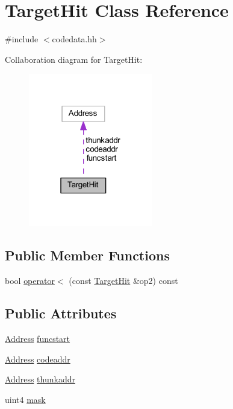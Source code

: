 \hypertarget{class_target_hit}{}\section{Target\+Hit Class Reference}
\label{class_target_hit}


{\ttfamily \#include $<$codedata.\+hh$>$}



Collaboration diagram for Target\+Hit\+:
\nopagebreak
\begin{figure}[H]
\begin{center}
\leavevmode
\includegraphics[width=154pt]{class_target_hit__coll__graph}
\end{center}
\end{figure}
\subsection*{Public Member Functions}
\begin{DoxyCompactItemize}
\item 
bool \mbox{\hyperlink{class_target_hit_a1391c4f1e43c98bf9429cfe1d7fcddb2}{operator$<$}} (const \mbox{\hyperlink{class_target_hit}{Target\+Hit}} \&op2) const
\end{DoxyCompactItemize}
\subsection*{Public Attributes}
\begin{DoxyCompactItemize}
\item 
\mbox{\hyperlink{class_address}{Address}} \mbox{\hyperlink{class_target_hit_a42ab0e3c3352543d9cb200d17b7e74b7}{funcstart}}
\item 
\mbox{\hyperlink{class_address}{Address}} \mbox{\hyperlink{class_target_hit_aa75c5e43b6f1706946f41bc6f22b9fa8}{codeaddr}}
\item 
\mbox{\hyperlink{class_address}{Address}} \mbox{\hyperlink{class_target_hit_a3e0aa2b35bbf3a559dde22a8c214a67e}{thunkaddr}}
\item 
uint4 \mbox{\hyperlink{class_target_hit_a87194e6e0f08f54b886b573137067428}{mask}}
\end{DoxyCompactItemize}


